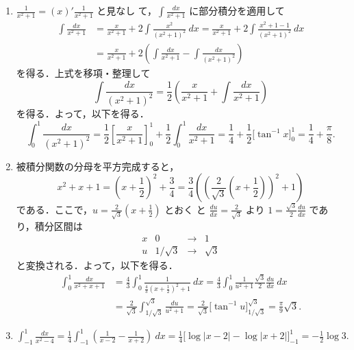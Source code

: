 \documentclass[11pt, uplatex, dvipdfmx]{jsarticle}
\newcommand{\ds}{\displaystyle}
\begin{document}
\begin{enumerate}[(1)]
     

   \item $\ds \frac{1}{x^2+1} = \left(x\right)' \frac{1}{x^2+1}$ と見なし
     て，$\ds \int \frac{dx}{x^2+1}$ に部分積分を適用して
     \[
       \begin{aligned}
         \int \frac{dx}{x^2+1} &= \frac{x}{x^2+1} + 2\int \frac{x^2}{(x^2+1)^2} \ dx
         = \frac{x}{x^2+1} +2 \int \frac{x^2+1 -1}{(x^2+1)^2} \ dx\\
         &= \frac{x}{x^2+1} + 2 \left(\int \frac{dx}{x^2+1} - \int \frac{dx}{(x^2+1)^2} \right)
       \end{aligned}
     \]
     を得る．上式を移項・整理して
     \[
       \int \frac{dx}{(x^2+1)^2} = \frac{1}{2} \left( \frac{x}{x^2+1} + \int \frac{dx}{x^2+1} \right)
     \]
     を得る．よって，以下を得る．
     \[
       \int_{0}^{1} \frac{dx}{(x^2+1)^2} = \frac{1}{2}
       \left[\frac{x}{x^2+1}\right]_{0}^{1} +\frac{1}{2} \int_{0}^{1}
       \frac{dx}{x^2+1} = \frac{1}{4} + \frac{1}{2} \Big[ \tan^{-1} x
       \Big]_{0}^{1} = \frac{1}{4} + \frac{\pi}{8}.
     \]



   \item 被積分関数の分母を平方完成すると，
     \[
       x^2+x+1 = \left(x + \frac{1}{2} \right)^2 + \frac{3}{4} 
       = \frac{3}{4}\left(\left(\frac{2}{\sqrt{3}}\left(x+\frac{1}{2}\right)\right)^2 +1\right)
     \]
     である．ここで，$u=\frac{2}{\sqrt{3}} \left(x+\frac{1}{2}\right)$ とおく
     と $\frac{du}{dx} = \frac{2}{\sqrt{3}}$ より
     $1 = \frac{\sqrt{3}}{2} \frac{du}{dx}$ であり，積分区間は
     \[
       \begin{array}{c|ccc}
         x & 0 & \to & 1\\ \hline
         u & 1/\sqrt{3} & \to & \sqrt{3}
       \end{array}
     \]
     と変換される．よって，以下を得る．
     \begin{align*}
      \int_{0}^{1} \frac{dx}{x^2+x+1} 
       &=  \frac{4}{3} \int_{0}^{1} \frac{1}{\frac{4}{3}\left( x+\frac{1}{2}\right)^2  +1}  \ dx
       =\frac{4}{3} \int_{0}^{1} \frac{1}{u^2+1} \frac{\sqrt{3}}{2} \frac{du}{dx} \ dx\\
       &  = \frac{2}{\sqrt{3}} \int_{1/\sqrt{3}}^{\sqrt{3}} \frac{du}{u^2+1} 
       = \frac{2}{\sqrt{3}} \Big[ \tan^{-1} u \Big]_{1/\sqrt{3}}^{\sqrt{3}} = \frac{\pi}{9}\sqrt{3}.
     \end{align*}

   \item
     $\ds \int_{-1}^{1} \frac{dx}{x^2-4} =\frac{1}{4} \int_{-1}^{1}
     \left( \frac{1}{x-2} - \frac{1}{x+2}\right) \ dx=\frac{1}{4}\Big[
     \log|x-2| - \log |x+2| \Big]_{-1}^{1} = -\frac{1}{2} \log 3.$


\end{enumerate}
\end{document}
